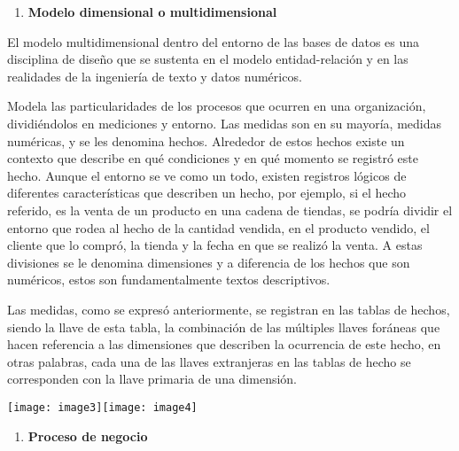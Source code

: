 \documentclass{article} %
\begin{document}
\noindent 

\noindent 

\noindent 

\begin{enumerate}
\item  \textbf{Modelo dimensional o multidimensional}
\end{enumerate}

\noindent \textbf{}

\noindent El modelo multidimensional dentro del entorno de las bases de datos es una disciplina de dise\~{n}o que se sustenta en el modelo entidad-relaci\'{o}n y en las realidades de la ingenier\'{i}a de texto y datos num\'{e}ricos. 

\noindent 

\noindent Modela las particularidades de los procesos que ocurren en una organizaci\'{o}n, dividi\'{e}ndolos en mediciones y entorno. Las medidas son en su mayor\'{i}a, medidas num\'{e}ricas, y se les denomina hechos. Alrededor de estos hechos existe un contexto que describe en qu\'{e} condiciones y en qu\'{e} momento se registr\'{o} este hecho. Aunque el entorno se ve como un todo, existen registros l\'{o}gicos de diferentes caracter\'{i}sticas que describen un hecho, por ejemplo, si el hecho referido, es la venta de un producto en una cadena de tiendas, se podr\'{i}a dividir el entorno que rodea al hecho de la cantidad vendida, en el producto vendido, el cliente que lo compr\'{o}, la tienda y la fecha en que se realiz\'{o} la venta. A estas divisiones se le denomina dimensiones y a diferencia de los hechos que son num\'{e}ricos, estos son fundamentalmente textos descriptivos.

\noindent 

\noindent Las medidas, como se expres\'{o} anteriormente, se registran en las tablas de hechos, siendo la llave de esta tabla, la combinaci\'{o}n de las m\'{u}ltiples llaves for\'{a}neas que hacen referencia   a las dimensiones que describen la ocurrencia de este hecho, en otras palabras, cada una de las llaves extranjeras en las tablas de hecho se corresponden con la llave primaria de una dimensi\'{o}n. 

\noindent \texttt{[image: image3]}\texttt{[image: image4]}

\noindent 

\begin{enumerate}
\item  \textbf{Proceso de negocio}
\end{enumerate}
\end{document}
